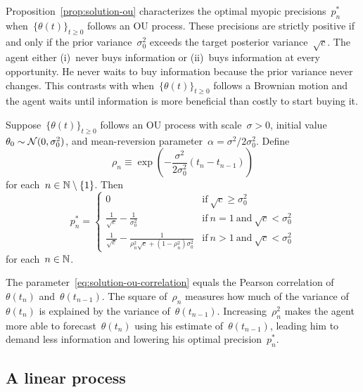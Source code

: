 \documentclass[11pt,oneside]{article}
\begin{document}
Proposition~\ref{prop:solution-ou} characterizes the optimal myopic precisions~$p_n^*$ when~$\{\theta(t)\}_{t\ge0}$ follows an OU process.
These precisions are strictly positive if and only if the prior variance~$\sigma_0^2$ exceeds the target posterior variance~$\sqrt{c}$.
The agent either
(i)~never buys information or
(ii)~buys information at every opportunity.
He never waits to buy information because the prior variance never changes.
This contrasts with when~$\{\theta(t)\}_{t\ge0}$ follows a Brownian motion and the agent waits until information is more beneficial than costly to start buying it.

\begin{proposition}
    \label{prop:solution-ou}
    Suppose~$\{\theta(t)\}_{t\ge0}$ follows an OU process with scale~$\sigma>0$, initial value~$\theta_0\sim\mathcal{N}(0,\sigma_0^2)$, and mean-reversion parameter~$\alpha=\sigma^2/2\sigma_0^2$.
    Define
    \begin{equation}
        \rho_n \equiv \exp\left(-\frac{\sigma^2}{2\sigma_0^2}(t_n-t_{n-1})\right) \label{eq:solution-ou-correlation}
    \end{equation}
    for each~$n\in\mathbb{N}\setminus\{1\}$.
    Then
    \[ p_n^*=\begin{cases}
        0 & \text{if}\ \sqrt{c}\ge\sigma_0^2 \\
        \frac{1}{\sqrt{c}}-\frac{1}{\sigma_0^2} & \text{if}\ n=1\ \text{and}\ \sqrt{c}<\sigma_0^2 \\
        \frac{1}{\sqrt{c}}-\frac{1}{\rho_n^2\sqrt{c}+(1-\rho_n^2)\sigma_0^2} & \text{if}\ n>1\ \text{and}\ \sqrt{c}<\sigma_0^2
    \end{cases} \]
    for each~$n\in\mathbb{N}$.
\end{proposition}
%

The parameter~\eqref{eq:solution-ou-correlation} equals the Pearson correlation of~$\theta(t_n)$ and~$\theta(t_{n-1})$.
The square of~$\rho_n$ measures how much of the variance of~$\theta(t_n)$ is explained by the variance of~$\theta(t_{n-1})$.
Increasing~$\rho_n^2$ makes the agent more able to forecast~$\theta(t_n)$ using his estimate of~$\theta(t_{n-1})$, leading him to demand less information and lowering his optimal precision~$p_n^*$.

\subsection{A linear process}
\end{document}
